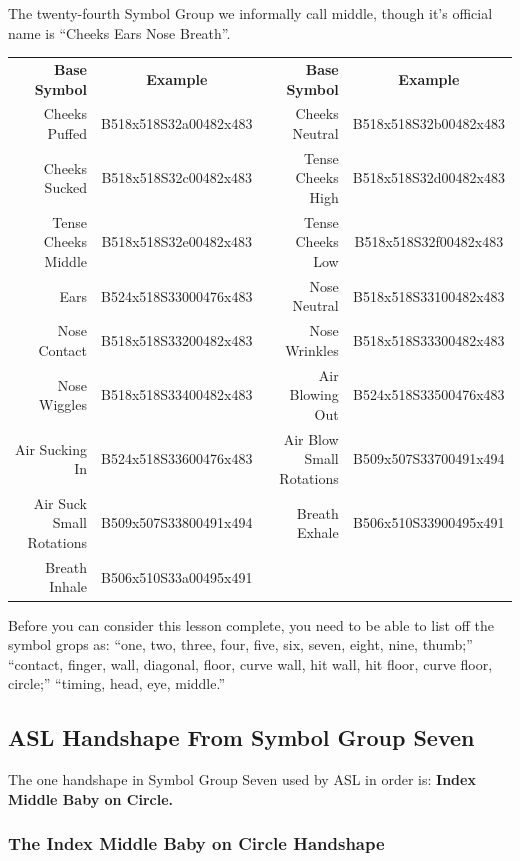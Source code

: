 \documentclass{article}
\begin{document}
The twenty-fourth Symbol Group we informally call middle, though it's official name is ``Cheeks Ears Nose Breath''.

\begin{center}
\begin{tabular}{rcrc}
\textbf{Base Symbol}&\textbf{Example}&\textbf{Base Symbol}&\textbf{Example}\\
Cheeks Puffed           &B518x518S32a00482x483&Cheeks Neutral          &B518x518S32b00482x483\\
Cheeks Sucked           &B518x518S32c00482x483&Tense Cheeks High       &B518x518S32d00482x483\\
Tense Cheeks Middle     &B518x518S32e00482x483&Tense Cheeks Low        &B518x518S32f00482x483\\
Ears                    &B524x518S33000476x483&Nose Neutral            &B518x518S33100482x483\\
Nose Contact            &B518x518S33200482x483&Nose Wrinkles           &B518x518S33300482x483\\
Nose Wiggles            &B518x518S33400482x483&Air Blowing Out         &B524x518S33500476x483\\
Air Sucking In          &B524x518S33600476x483&Air Blow Small Rotations&B509x507S33700491x494\\
Air Suck Small Rotations&B509x507S33800491x494&Breath Exhale           &B506x510S33900495x491\\
Breath Inhale           &B506x510S33a00495x491\\
\end{tabular}
\end{center}

Before you can consider this lesson complete, you need to be able to list off the symbol grops as:
``one, two, three, four, five, six, seven, eight, nine, thumb;''
``contact, finger, wall, diagonal, floor, curve wall, hit wall, hit floor, curve floor, circle;''
``timing, head, eye, middle.''

\subsection{ASL Handshape From Symbol Group Seven}

The one handshape in Symbol Group Seven used by ASL in order is:
{\bf
Index Middle Baby on Circle.
}

\subsubsection{The Index Middle Baby on Circle Handshape}
\end{document}
